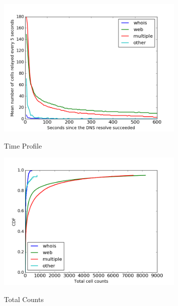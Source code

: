 \begin{figure}
	\centering
	\begin{subfigure}[t]{0.32\textwidth}
		\centering
		\includegraphics[scale=0.3]{images/exitmeasurement.png}
		\label{fig:stats_a}
		\caption{Time Profile}
	\end{subfigure}
	\begin{subfigure}[t]{0.32\textwidth}
		\centering
		\includegraphics[scale=0.3]{images/totcellcountscdf.png}
		\label{fig:stats_b}
		\caption{Total Counts}
	\end{subfigure}
	\begin{subfigure}[t]{0.32\textwidth}
		\centering

\end{subfigure}
\end{figure}
